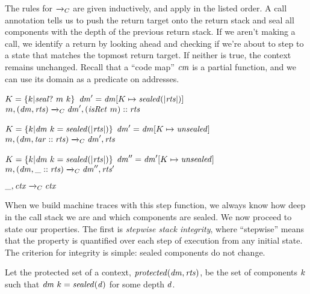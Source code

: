 \documentclass[acmsmall,review,anonymous]{acmart}\settopmatter{printfolios=true,printccs=false,printacmref=false}
\begin{document}
{The rules for \(\xrightarrow{}_C\) are given inductively, and apply in the listed order.
A call annotation tells us to push the return target onto the return stack and
seal all components with the depth of the previous return stack. If we aren't making a call,
we identify a return by looking ahead and checking if we're about to step to a state
that matches the topmost return target. If neither is true, the context remains unchanged.
Recall that a ``code map'' \(\mathit{cm}\) is a partial function, and we can use its domain
as a predicate on addresses.

\judgmentthree[ Call]
              {\(\codemap ~ (\mach ~ \PCname)\)}
              {\(K = \{k | \mathit{seal?} ~ m ~ k\}\)}
              {\(\mathit{dm}' = \mathit{dm}[K \mapsto \mathit{sealed(|\mathit{rts}|)}]\)}
                {\(m,(\mathit{dm},\mathit{rts}) \xrightarrow{}_C \mathit{dm}',(\mathit{isRet} ~ m)::\mathit{rts}\)}

\vspace*{-1ex}
              {\(K = \{k | \mathit{dm} ~ k = \mathit{sealed(|\mathit{rts}|)}\}\)}
              {\(\mathit{dm}' = \mathit{dm}[K \mapsto \mathit{unsealed}]\)}
              {\(m,(\mathit{dm},\mathit{tar}::\mathit{rts}) \xrightarrow{}_C \mathit{dm}',\mathit{rts}\)}

\vspace*{-1ex}
              {\(K = \{k | \mathit{dm} ~ k = \mathit{sealed(|\mathit{rts}|)}\}\)}
              {\(\mathit{dm}'' = \mathit{dm}'[K \mapsto \mathit{unsealed}]\)}
              {\(m,(\mathit{dm},\mbox{\_}::\mathit{rts}) \xrightarrow{}_C \mathit{dm}'',\mathit{rts}'\)}

\vspace*{-3.5ex}
\judgment[ Default]
         {}
         {\(\mbox{\_},\mathit{ctx} \xrightarrow{}_C \mathit{ctx}\)}

When we build machine traces with this step function, we always know how deep in the
call stack we are and which components are sealed. We now proceed to state our properties.
The first is {\em stepwise stack integrity}, where ``stepwise'' means that the property is
quantified over each step of execution from any initial state. The criterion for integrity
is simple: sealed components do not change.

Let the protected set of a context, \(\mathit{protected}(\mathit{dm},\mathit{rts})\), be the
set of components \(k\) such that \(\mathit{dm} ~ k = \mathit{sealed(d)}\)
for some depth \(d\).

}
\end{document}
